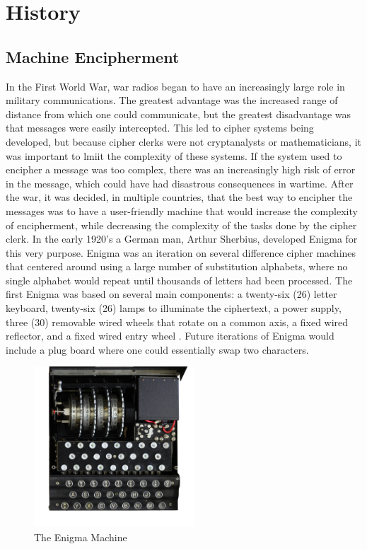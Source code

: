 \chapter{History}\label{chap:history}

\section{Machine Encipherment}
In the First World War, war radios began to have an increasingly large role in military communications. The greatest advantage was the increased range of distance from which one could communicate, but the greatest disadvantage was that messages were easily intercepted. This led to cipher systems being developed, but because cipher clerks were not cryptanalysts or mathematicians, it was important to lmiit the complexity of these systems. If the system used to encipher a message was too complex, there was an increasingly high risk of error in the message, which could have had disastrous consequences in wartime. After the war, it was decided, in multiple countries, that the best way to encipher the messages was to have a user-friendly machine that would increase the complexity of encipherment, while decreasing the complexity of the tasks done by the cipher clerk. In the early 1920’s a German man, Arthur Sherbius, developed Enigma for this very purpose. Enigma was an iteration on several difference cipher machines that centered around using a large number of substitution alphabets, where no single alphabet would repeat until thousands of letters had been processed. The first Enigma was based on several main components: a twenty-six (26) letter keyboard, twenty-six (26) lamps to illuminate the ciphertext, a power supply, three (30) removable wired wheels that rotate on a common axis, a fixed wired reflector, and a fixed wired entry wheel \cite{rfc01}. Future iterations of Enigma would include a plug board where one could essentially swap two characters.

\begin{figure}[h!]
\begin{centering}
  \includegraphics[height=6cm]{images/enigma.jpg}
  \caption{The Enigma Machine}
  \label{fig:machine1}
\end{centering}
\end{figure}

